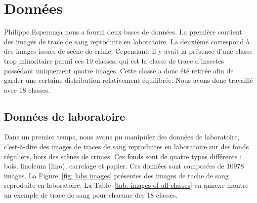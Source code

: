 \documentclass[a4paper]{article}
\begin{document}
\section{Données}

Philippe Esperança nous a fourni deux bases de données. La première contient des images de trace de sang reproduite en laboratoire. La deuxième correspond à des images issues de scène de crime.
Cependant, il y avait la présence d'une classe trop minoritaire parmi ces 19 classes, qui est la classe de trace d'insectes possédant uniquement quatre images. Cette classe a donc été retirée afin de garder une certaine distribution relativement équilibrée. Nous avons donc travaillé avec 18 classes.

\subsection{Données de laboratoire}

Dans un premier temps, nous avons pu manipuler des données de laboratoire, c'est-à-dire des images de traces de sang reproduites en laboratoire sur des fonds réguliers, hors des scènes de crimes. Ces fonds sont de quatre types différents : bois, linoleum (lino), carrelage et papier. Ces données sont composées de $10978$ images.
La Figure~\ref{fig: labs images} présentes des images de tache de sang reproduite en laboratoire. La Table~\ref{tab: images of all classes} en annexe montre un exemple de trace de sang pour chacune des 18 classes.
\end{document}
